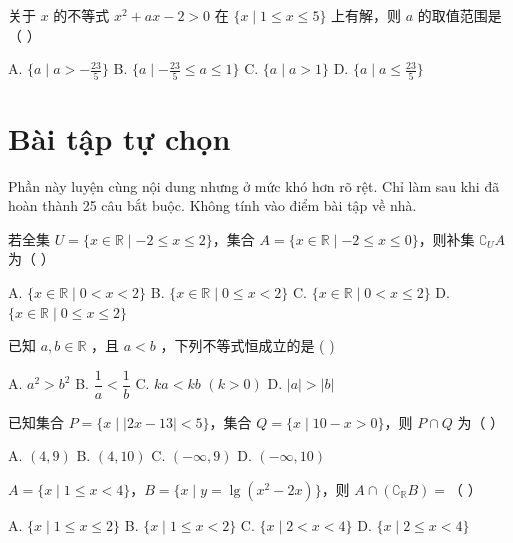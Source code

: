 \documentclass[11pt, a4paper]{article}
\begin{document}
\begin{baitap}[25]
关于 $x$ 的不等式 $x^2+ax-2>0$ 在 $\{x\mid 1\le x\le5\}$ 上有解，则 $a$ 的取值范围是（ ）
\par\vspace{3pt}
\noindent A. $\{a\mid a>-\frac{23}{5}\}$ \quad B. $\{a\mid -\frac{23}{5}\le a\le1\}$ \quad C. $\{a\mid a>1\}$ \quad D. $\{a\mid a\le\frac{23}{5}\}$
\end{baitap}

\clearpage
\section{Bài tập tự chọn}

Phần này luyện cùng nội dung nhưng ở mức khó hơn rõ rệt. Chỉ làm sau khi đã hoàn thành 25 câu bắt buộc. Không tính vào điểm bài tập về nhà.

\begin{baitap}[1]
若全集 $U = \{x \in \mathbb{R} \mid -2 \leq x \leq 2\}$，集合 $A = \{x \in \mathbb{R} \mid -2 \leq x \leq 0\}$，则补集 $\complement_U A$ 为（ ）
\par\vspace{3pt}
\noindent A. $\{x \in \mathbb{R} \mid 0 < x < 2\}$ \quad B. $\{x \in \mathbb{R} \mid 0 \leq x < 2\}$ \quad C. $\{x \in \mathbb{R} \mid 0 < x \leq 2\}$ \quad D. $\{x \in \mathbb{R} \mid 0 \leq x \leq 2\}$
\end{baitap}

\begin{baitap}[2]
已知 $a, b \in \mathbb{R}$ ，且 $a < b$ ，下列不等式恒成立的是 ( )
\par\vspace{3pt}
\noindent A. $a^2 > b^2$ \quad B. $\dfrac{1}{a} < \dfrac{1}{b}$ \quad C. $ka < kb$ $(k > 0)$ \quad D. $|a| > |b|$
\end{baitap}

\begin{baitap}[3]
已知集合 $P=\{x\mid |2x-13|<5\}$，集合 $Q=\{x\mid 10-x>0\}$，则 $P\cap Q$ 为（ ）
\par\vspace{3pt}
\noindent A. $(4,9)$ \quad B. $(4,10)$ \quad C. $(-\infty,9)$ \quad D. $(-\infty,10)$
\end{baitap}

\begin{baitap}[4]
$A = \{x \mid 1 \leq x < 4\}$，$B = \{x \mid y = \lg(x^2 - 2x)\}$，则 $A \cap (\complement_{\mathbb{R}} B) =$（ ）
\par\vspace{3pt}
\noindent A. $\{x \mid 1 \leq x \leq 2\}$ \quad B. $\{x \mid 1 \leq x < 2\}$ \quad C. $\{x \mid 2 < x < 4\}$ \quad D. $\{x \mid 2 \leq x < 4\}$
\end{baitap}
\end{document}
